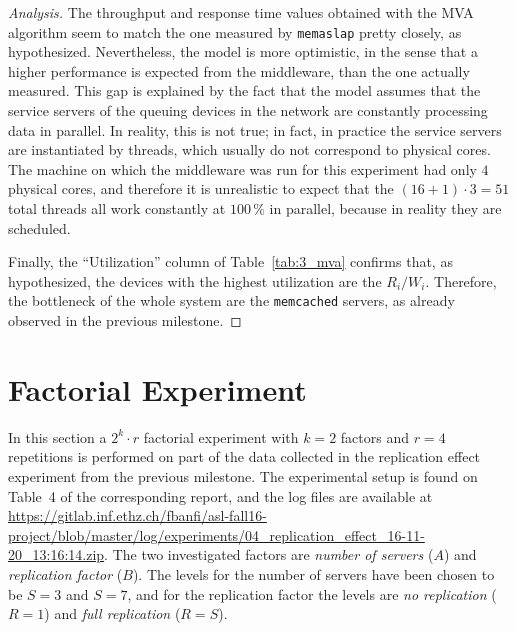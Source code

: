 \documentclass[11pt]{article}
\newcommand\task[1]{{\color[HTML]{999999}\subsection{Task}#1}}
\renewcommand\task[1]{}
\theoremstyle{definition}
\newenvironment{ana}[1][\proofname]{\begin{proof}[Analysis]}{\end{proof}}
\renewcommand\t\texttt
\newcommand\repl{04_replication_effect_16-11-20_13:16:14}
\begin{document}
\begin{ana}
    The throughput and response time values obtained with the MVA algorithm seem to match the one measured by \t{memaslap} pretty closely, as hypothesized.
    Nevertheless, the model is more optimistic, in the sense that a higher performance is expected from the middleware, than the one actually measured.
    This gap is explained by the fact that the model assumes that the service servers of the queuing devices in the network are constantly processing data in parallel.
    In reality, this is not true; in fact, in practice the service servers are instantiated by threads, which usually do not correspond to physical cores.
    The machine on which the middleware was run for this experiment had only $4$ physical cores, and therefore it is unrealistic to expect that the $(16+1)\cdot3=51$ total threads all work constantly at $100\,\%$ in parallel, because in reality they are scheduled.
    
    Finally, the ``Utilization'' column of Table~\ref{tab:3_mva} confirms that, as hypothesized, the devices with the highest utilization are the $R_i/W_i$.
    Therefore, the bottleneck of the whole system are the \t{memcached} servers, as already observed in the previous milestone.
\end{ana}

\task{
Length: 1-3 pages

Based on the outcome of the different modeling efforts from the previous sections, build a comprehensive network of queues model for the whole system. Compare it with experimental data and use the methods discussed in the lecture and the book to provide an in-depth analysis of the behavior. This includes the identification and analysis of bottlenecks in your system. Make sure to follow the model-related guidelines described in the Notes!
}

\clearpage

\section{Factorial Experiment}\label{sec:2k-experiment-re}

In this section a $2^k\cdot r$ factorial experiment with $k=2$ factors and $r=4$ repetitions is performed on part of the data collected in the replication effect experiment from the previous milestone.
The experimental setup is found on Table~4 of the corresponding report, and the log files are available at \url{https://gitlab.inf.ethz.ch/fbanfi/asl-fall16-project/blob/master/log/experiments/\repl.zip}.
The two investigated factors are \emph{number of servers} ($A$) and \emph{replication factor} ($B$).
The levels for the number of servers have been chosen to be $S=3$ and $S=7$, and for the replication factor the levels are \emph{no replication} ($R=1$) and \emph{full replication} ($R=S$).
\end{document}
